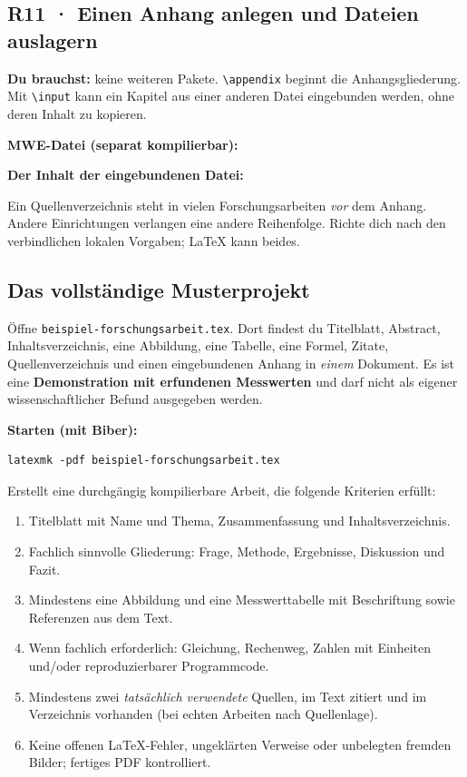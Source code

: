 \documentclass[11pt,a4paper,parskip=half]{scrartcl} %
\newcommand{\mwe}[2]{%
  \noindent
  
  \textbf{MWE-Datei (separat kompilierbar):} \path{#1}\par\vspace{-4pt}
  

}
\begin{document}
\subsection{R11 · Einen Anhang anlegen und Dateien auslagern}
\textbf{Du brauchst:} keine weiteren Pakete. \texttt{\textbackslash appendix} beginnt die Anhangsgliederung. Mit \texttt{\textbackslash input} kann
ein Kapitel aus einer anderen Datei eingebunden werden, ohne deren Inhalt
zu kopieren.
\mwe{rezepte/11_anhang_mehrere_dateien.tex}{R11: Anhang und ausgelagertes Messprotokoll}
\textbf{Der Inhalt der eingebundenen Datei:}

\begin{merkbox}
Ein Quellenverzeichnis steht in vielen Forschungsarbeiten \emph{vor} dem Anhang.
Andere Einrichtungen verlangen eine andere Reihenfolge. Richte dich nach den
verbindlichen lokalen Vorgaben; LaTeX kann beides.
\end{merkbox}

\subsection{Das vollständige Musterprojekt}
Öffne \texttt{beispiel-forschungsarbeit.tex}. Dort findest du Titelblatt,
Abstract, Inhaltsverzeichnis, eine Abbildung, eine Tabelle, eine Formel,
Zitate, Quellenverzeichnis und einen eingebundenen Anhang in \emph{einem}
Dokument. Es ist eine \textbf{Demonstration mit erfundenen Messwerten} und darf
nicht als eigener wissenschaftlicher Befund ausgegeben werden.

\textbf{Starten (mit Biber):}
\begin{lstlisting}[language={},numbers=none]
latexmk -pdf beispiel-forschungsarbeit.tex
\end{lstlisting}

\begin{aufgabebox}[title={Abschlussaufgabe: eure eigene Forschungsarbeit}]
Erstellt eine durchgängig kompilierbare Arbeit, die folgende Kriterien erfüllt:
\begin{enumerate}
\item Titelblatt mit Name und Thema, Zusammenfassung und Inhaltsverzeichnis.
\item Fachlich sinnvolle Gliederung: Frage, Methode, Ergebnisse,
      Diskussion und Fazit.
\item Mindestens eine Abbildung und eine Messwerttabelle mit Beschriftung
      sowie Referenzen aus dem Text.
\item Wenn fachlich erforderlich: Gleichung, Rechenweg, Zahlen mit Einheiten
      und/oder reproduzierbarer Programmcode.
\item Mindestens zwei \emph{tatsächlich verwendete} Quellen, im Text zitiert
      und im Verzeichnis vorhanden (bei echten Arbeiten nach Quellenlage).
\item Keine offenen LaTeX-Fehler, ungeklärten Verweise oder unbelegten
      fremden Bilder; fertiges PDF kontrolliert.
\end{enumerate}
\end{aufgabebox}
\end{document}
